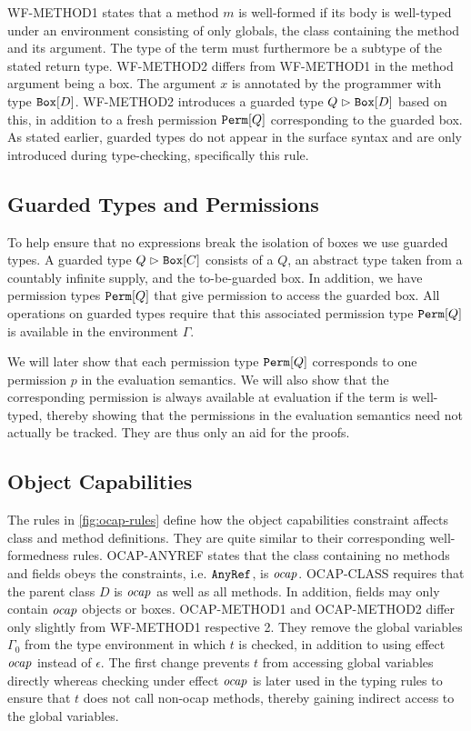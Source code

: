 WF-METHOD1 states that a method $m$ is well-formed if its body is well-typed under an environment consisting of only globals, the class containing the method and its argument.
The type of the term must furthermore be a subtype of the stated return type. WF-METHOD2 differs from WF-METHOD1 in the method argument being a box. The argument $x$ is annotated by the programmer with type $\texttt{Box}[D]$. WF-METHOD2 introduces a guarded type $Q \vartriangleright \texttt{Box}[D]$ based on this, in addition to a fresh permission $\texttt{Perm}[Q]$ corresponding to the guarded box. As stated earlier, guarded types do not appear in the surface syntax and are only introduced during type-checking, specifically this rule.

\subsection{Guarded Types and Permissions}
To help ensure that no expressions break the isolation of boxes we use guarded types. A guarded type $Q \vartriangleright \texttt{Box}[C]$ consists of a $Q$, an abstract type taken from a countably infinite supply, and the to-be-guarded box. In addition, we have permission types $\texttt{Perm}[Q]$ that give permission to access the guarded box. All operations on guarded types require that this associated permission type $\texttt{Perm}[Q]$ is available in the environment $\Gamma$.

We will later show that each permission type $\texttt{Perm}[Q]$ corresponds to one permission $p$ in the evaluation semantics. We will also show that the corresponding permission is always available at evaluation if the term is well-typed, thereby showing that the permissions in the evaluation semantics need not actually be tracked. They are thus only an aid for the proofs.

\subsection{Object Capabilities}
The rules in \cref{fig:ocap-rules} define how the object capabilities constraint affects class and method definitions. They are quite similar to their corresponding well-formedness rules. OCAP-ANYREF states that the class containing no methods and fields obeys the constraints, i.e. $\texttt{AnyRef}$, is $\mathop{\mathit{ocap}}$. OCAP-CLASS requires that the parent class $D$ is $\mathop{\mathit{ocap}}$ as well as all methods. In addition, fields may only contain $\mathop{\mathit{ocap}}$ objects or boxes. OCAP-METHOD1 and OCAP-METHOD2 differ only slightly from WF-METHOD1 respective 2. They remove the global variables $\Gamma_0$ from the type environment in which $t$ is checked, in addition to using effect $\mathop{\mathit{ocap}}$ instead of $\epsilon$. The first change prevents $t$ from accessing global variables directly whereas checking under effect $\mathop{\mathit{ocap}}$ is later used in the typing rules to ensure that $t$ does not call non-ocap methods, thereby gaining indirect access to the global variables.


